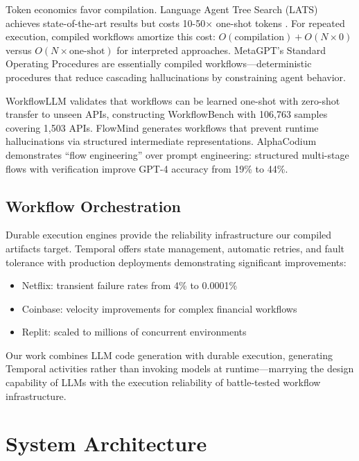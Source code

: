 \documentclass[11pt]{article}
\begin{document}
Token economics favor compilation. Language Agent Tree Search (LATS) achieves state-of-the-art results but costs 10-50$\times$ one-shot tokens \citep{zhou2024lats}. For repeated execution, compiled workflows amortize this cost: $O(\text{compilation}) + O(N \times 0)$ versus $O(N \times \text{one-shot})$ for interpreted approaches. MetaGPT's Standard Operating Procedures \citep{hong2024metagpt} are essentially compiled workflows—deterministic procedures that reduce cascading hallucinations by constraining agent behavior.

WorkflowLLM \citep{fan2024workflowllm} validates that workflows can be learned one-shot with zero-shot transfer to unseen APIs, constructing WorkflowBench with 106,763 samples covering 1,503 APIs. FlowMind \citep{zeng2024flowmind} generates workflows that prevent runtime hallucinations via structured intermediate representations. AlphaCodium \citep{ridnik2024alphacodium} demonstrates ``flow engineering'' over prompt engineering: structured multi-stage flows with verification improve GPT-4 accuracy from 19\% to 44\%.

\subsection{Workflow Orchestration}

Durable execution engines provide the reliability infrastructure our compiled artifacts target. Temporal \citep{temporal2024} offers state management, automatic retries, and fault tolerance with production deployments demonstrating significant improvements:
\begin{itemize}
    \item Netflix: transient failure rates from 4\% to 0.0001\%
    \item Coinbase: velocity improvements for complex financial workflows
    \item Replit: scaled to millions of concurrent environments
\end{itemize}

Our work combines LLM code generation with durable execution, generating Temporal activities rather than invoking models at runtime—marrying the design capability of LLMs with the execution reliability of battle-tested workflow infrastructure.

\section{System Architecture}
\label{sec:architecture}
\end{document}
